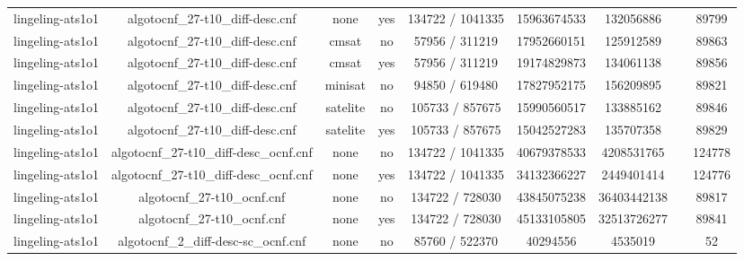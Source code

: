 \begin{appendices}
\begin{table}[p]
\begin{center}
\begin{tabular}{l|cccccccc}
  lingeling-ats1o1               & algotocnf\_27-t10\_diff-desc.cnf & none       & yes   & 134722 / 1041335 & 15963674533 & 132056886 &            & 89799 \\ %
  lingeling-ats1o1               & algotocnf\_27-t10\_diff-desc.cnf & cmsat      & no    & 57956 / 311219 & 17952660151 & 125912589 &            & 89863 \\ %
  lingeling-ats1o1               & algotocnf\_27-t10\_diff-desc.cnf & cmsat      & yes   & 57956 / 311219 & 19174829873 & 134061138 &            & 89856 \\ %
  lingeling-ats1o1               & algotocnf\_27-t10\_diff-desc.cnf & minisat    & no    & 94850 / 619480 & 17827952175 & 156209895 &            & 89821 \\ %
  lingeling-ats1o1               & algotocnf\_27-t10\_diff-desc.cnf & satelite   & no    & 105733 / 857675 & 15990560517 & 133885162 &            & 89846 \\ %
  lingeling-ats1o1               & algotocnf\_27-t10\_diff-desc.cnf & satelite   & yes   & 105733 / 857675 & 15042527283 & 135707358 &            & 89829 \\ %
  lingeling-ats1o1               & algotocnf\_27-t10\_diff-desc\_ocnf.cnf & none       & no    & 134722 / 1041335 & 40679378533 & 4208531765 &            & 124778 \\ %
  lingeling-ats1o1               & algotocnf\_27-t10\_diff-desc\_ocnf.cnf & none       & yes   & 134722 / 1041335 & 34132366227 & 2449401414 &            & 124776 \\ %
  lingeling-ats1o1               & algotocnf\_27-t10\_ocnf.cnf    & none       & no    & 134722 / 728030 & 43845075238 & 36403442138 &            & 89817 \\ %
  lingeling-ats1o1               & algotocnf\_27-t10\_ocnf.cnf    & none       & yes   & 134722 / 728030 & 45133105805 & 32513726277 &            & 89841 \\ %
  lingeling-ats1o1               & algotocnf\_2\_diff-desc-sc\_ocnf.cnf & none       & no    & 85760 / 522370 & 40294556  & 4535019   &            & 52 \\ %

\end{tabular}
\end{center}
\end{table}
\end{appendices}
